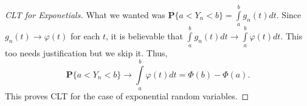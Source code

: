 \documentclass[preprint,  11pt]{amsart}
\theoremstyle{plain} %
\theoremstyle{definition} %
\begin{document}
\begin{proof}[CLT for Exponetials]
What we wanted was $\mathbf{P}\{a<Y_{n}<b\}=\int\limits_{a}^{b}g_{n}(t) dt$. Since $g_{n}(t)\rightarrow \varphi(t)$ for each $t$, it is believable that $\int\limits_{a}^{b}g_{n}(t) dt\rightarrow \int\limits_{a}^{b}\varphi(t) dt$. This too needs justification but we skip it. Thus,
$$
\mathbf{P}\{a<Y_{n}<b\} \rightarrow \int\limits_{a}^{b}\varphi(t) dt = \Phi(b)-\Phi(a).
$$
This proves CLT for the case of exponential random variables.
\end{proof}
%




%





\end{document}
